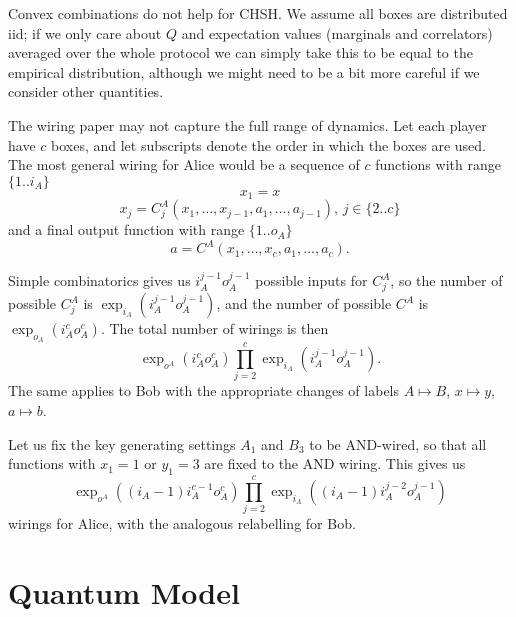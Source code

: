 \documentclass[10pt, a4paper]{article}
\newcommand{\?}{\mathrel{?}} %
\numberwithin{equation}{section} %
\theoremstyle{definition}
\theoremstyle{plain}
\theoremstyle{plain}
\begin{document}
    Convex combinations do not help for CHSH\@. We assume all boxes are distributed iid; if we only care about \(Q\) and expectation values (marginals and correlators) averaged over the whole protocol we can simply take this to be equal to the empirical distribution, although we might need to be a bit more careful if we consider other quantities.

    The wiring paper may not capture the full range of dynamics. Let each player have \(c\) boxes, and let subscripts denote the order in which the boxes are used. The most general wiring for Alice would be a sequence of \(c\) functions with range \(\{1..i_A\}\)
    \begin{equation} x_1 = x \end{equation}
    \begin{equation} x_j = C_j^A(x_1, \ldots, x_{j-1}, a_1, \ldots, a_{j-1}),\,j \in \{2..c\} \end{equation}
    and a final output function with range \(\{1..o_A\}\)
    \begin{equation} a = C^A(x_1, \ldots, x_{c}, a_1, \ldots, a_{c}). \end{equation}

    Simple combinatorics gives us \(i_A^{j-1} o_A^{j-1}\) possible inputs for \(C_j^A\), so the number of possible \(C_j^A\) is \(\exp_{i_A}(i_A^{j-1} o_A^{j-1})\), and the number of possible \(C^A\) is \(\exp_{o_A}(i_A^{c} o_A^{c})\). The total number of wirings is then
    \begin{equation}
      \exp_{o^A}(i_A^c o_A^c) \prod_{j=2}^c \exp_{i_A}(i_A^{j-1} o_A^{j-1}).
    \end{equation}
    The same applies to Bob with the appropriate changes of labels \(A \mapsto B\), \(x \mapsto y\), \(a \mapsto b\). 

    Let us fix the key generating settings \(A_1\) and \(B_3\) to be AND-wired, so that all functions with \(x_1 = 1\) or \(y_1 = 3\) are fixed to the AND wiring. This gives us
    \begin{equation}
      \exp_{o^A}((i_A-1)i_A^{c-1} o_A^c) \prod_{j=2}^c \exp_{i_A}((i_A-1)i_A^{j-2} o_A^{j-1})
    \end{equation}
    wirings for Alice, with the analogous relabelling for Bob.

    \section{Quantum Model}
\end{document}

